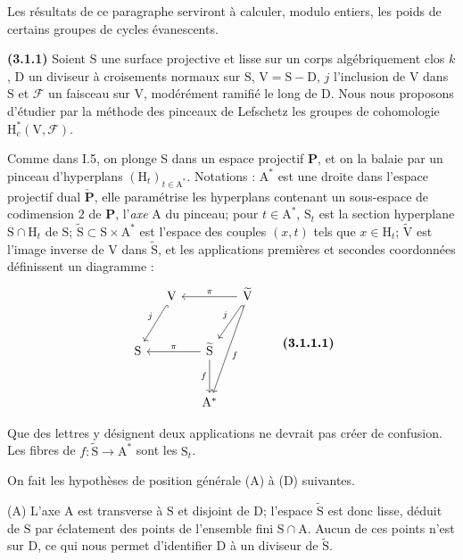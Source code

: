 \documentclass[11pt,leqno]{article}
\begin{document}
Les résultats de ce paragraphe serviront à calculer, modulo entiers, les poids de certains groupes de cycles évanescents.

\textbf{(3.1.1)} Soient \(\mathrm S\) une surface projective et lisse sur un corps algébriquement clos \(k\), \(\mathrm D\) un diviseur à croisements normaux sur \(\mathrm S\), \(\mathrm V=\mathrm S-\mathrm D\), \(j\) l’inclusion de \(\mathrm V\) dans \(\mathrm S\) et \(\mathscr F\) un faisceau sur \(\mathrm V\), modérément ramifié le long de \(\mathrm D\). Nous nous proposons d’étudier par la méthode des pinceaux de Lefschetz les groupes de cohomologie \(\mathrm H_c^*(\mathrm V,\mathscr F)\).

Comme dans I.5, on plonge \(\mathrm S\) dans un espace projectif \(\mathbf P\), et on la balaie par un pinceau d’hyperplans \((\mathrm H_t)_{t\in\mathrm A^*}\). Notations : \(\mathrm A^*\) est une droite dans l’espace projectif dual \(\check{\mathbf P}\), elle paramétrise les hyperplans contenant un sous-espace de codimension \(2\) de \(\mathbf P\), l’\textit{axe} \(\mathrm A\) du pinceau; pour \(t\in\mathrm A^*\), \(\mathrm S_t\) est la section hyperplane \(\mathrm S\cap\mathrm H_t\) de \(\mathrm S\); \(\widetilde{\mathrm S}\subset\mathrm S\times\mathrm A^*\) est l’espace des couples \((x,t)\) tels que \(x\in\mathrm H_t\); \(\widetilde{\mathrm V}\) est l’image inverse de \(\mathrm V\) dans \(\widetilde{\mathrm S}\), et les applications premières et secondes coordonnées définissent un diagramme :
\[
\begin{tikzcd}[ampersand replacement=\&, column sep=small, row sep=large]
\& \mathrm V \arrow[dl,hook,"j"'] \& \&
\widetilde{\mathrm V}
  \arrow[ll,"\pi"']
  \arrow[dl,hook,"j"']
  \arrow[ddl,"f"] \\
\mathrm S \& \&
\widetilde{\mathrm S}\arrow[ll,"\pi"']\arrow[d,"f"'] \& \\
\& \& \mathrm A^* \&
\end{tikzcd}
\tag*{\textbf{(3.1.1.1)}}
\]

Que des lettres y désignent deux applications ne devrait pas créer de confusion. Les fibres de \(f:\widetilde{\mathrm S}\to\mathrm A^*\) sont les \(\mathrm S_t\).

On fait les hypothèses de position générale (A) à (D) suivantes.

(A) L’axe \(\mathrm A\) est transverse à \(\mathrm S\) et disjoint de \(\mathrm D\); l’espace \(\widetilde{\mathrm S}\) est donc lisse, déduit de \(\mathrm S\) par éclatement des points de l’ensemble fini \(\mathrm S\cap\mathrm A\). Aucun de ces points n’est sur \(\mathrm D\), ce qui nous permet d’identifier \(\mathrm D\) à un diviseur de \(\widetilde{\mathrm S}\).
\end{document}
